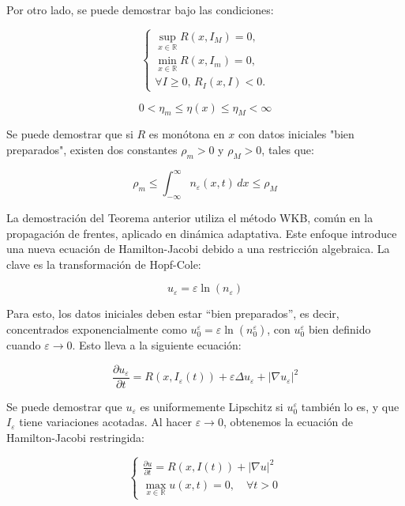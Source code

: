 Por otro lado, se puede demostrar bajo las condiciones:

\begin{equation*}
	\begin{cases}
		\sup_{x \in \mathbb{R}} R(x, I_M) = 0, \\
		\min_{x \in \mathbb{R}} R(x, I_m) = 0, \\
		\forall I \geq 0, \, R_I(x, I) < 0.
	\end{cases}
\end{equation*}

\begin{equation*}
	0< \eta_m \leq \eta(x) \leq \eta_M < \infty
\end{equation*}

Se puede demostrar que si $R$ es monótona en $x$ con datos iniciales "bien preparados", existen dos constantes $\rho_m >0$ y $\rho_M >0$, tales que:

\begin{equation*}
	\rho_m \leq \int_{-\infty}^{\infty} n_\varepsilon(x,t) \, dx \leq \rho_M
\end{equation*}

La demostración del Teorema anterior utiliza el método WKB, común en la propagación de frentes, aplicado en dinámica adaptativa. Este enfoque introduce una nueva ecuación de Hamilton-Jacobi debido a una restricción algebraica. La clave es la transformación de Hopf-Cole:

\begin{equation}
	u_\varepsilon = \varepsilon \ln(n_\varepsilon)
\end{equation}


Para esto, los datos iniciales deben estar ``bien preparados'', es decir, concentrados exponencialmente como \( u_0^\varepsilon = \varepsilon \ln(n_0^\varepsilon) \), con \( u_0^\varepsilon \) bien definido cuando \( \varepsilon \to 0 \). Esto lleva a la siguiente ecuación:

\begin{equation*}
	\frac{\partial u_\varepsilon}{\partial t} = R(x, I_\varepsilon(t)) +   \varepsilon \Delta u_\varepsilon + |\nabla u_\varepsilon|^2
\end{equation*}

Se puede demostrar que \( u_\varepsilon \) es uniformemente Lipschitz si \( u_0^\varepsilon \) también lo es, y que \( I_\varepsilon \) tiene variaciones acotadas. Al hacer \( \varepsilon \to 0 \), obtenemos la ecuación de Hamilton-Jacobi restringida:


\begin{equation*}
	\begin{cases}
		\frac{\partial u}{\partial t} = R(x, I(t)) + |\nabla u|^2 \\
		\max_{x \in \mathbb{R}} u(x, t) = 0, \quad \forall t > 0
	\end{cases}
\end{equation*}


